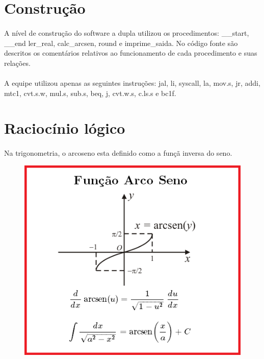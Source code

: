 \documentclass[a4paper, 12pt]{article}
\begin{document}
\section{Constru\c{c}\~ao}
\paragraph{}	A n\'ivel de constru\c{c}\~ao do software a dupla utilizou os procedimentos: \_\_start, \_\_end ler\_real, calc\_arcsen, round e imprime\_saida. No c\'odigo fonte s\~ao descritos os coment\'arios relativos ao funcionamento de cada procedimento e suas rela\c{c}\~oes.
\paragraph{}	A equipe utilizou apenas as seguintes instru\c{c}\~oes: jal, li, syscall, la, mov.s, jr, addi, mtc1, cvt.s.w, mul.s, sub.s, beq, j, cvt.w.s, c.ls.s e bc1f.

\section{Racioc\'inio l\'ogico} 
	\paragraph{}	Na trigonometria, o arcoseno est\´a definido como a funç\~a inversa do seno.
	\begin{figure}[H]
		\centering
		\includegraphics[scale=0.5]{img9.png}
	\end{figure}
\end{document}

